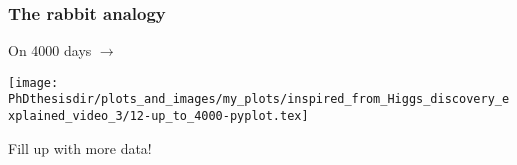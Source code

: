 
\begin{frame}
\frametitle{The rabbit analogy}
\addtocounter{framenumber}{-1}
\transwipe[direction=90]
\begin{center}
\begin{minipage}[c]{.29\textwidth}
On \num{4000} days $\rightarrow$
\end{minipage}
\begin{minipage}[c]{.4\textwidth}
\vspace{-\baselineskip}
\texttt{[image: \\PhDthesisdir/plots\_and\_images/my\_plots/inspired\_from\_Higgs\_discovery\_explained\_video\_3/12-up\_to\_4000-pyplot.tex]}
\end{minipage}
\begin{minipage}[c]{.29\textwidth}
Fill up with more data!
\end{minipage}
\end{center}
\end{frame}


